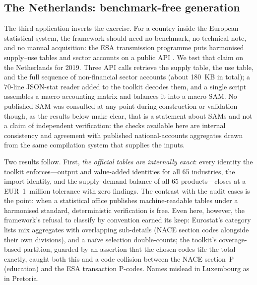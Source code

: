 \subsection{The Netherlands: benchmark-free generation}
\label{sec:applications:nl}

The third application inverts the exercise. For a country inside the
European statistical system, the framework should need no benchmark, no
technical note, and no manual acquisition: the ESA transmission programme
puts harmonised supply--use tables and sector accounts on a public API
\citep{eurostat2008}. We test that claim on the Netherlands for 2019.
Three API calls retrieve the supply table, the use table, and the full
sequence of non-financial sector accounts (about 180~KB in total); a
70-line JSON-stat reader added to the toolkit decodes them, and a single
script assembles a macro accounting matrix and balances it into a macro
SAM. No published SAM was consulted at any point during construction or
validation---though, as the results below make clear, that is a statement
about SAMs and not a claim of independent verification: the checks
available here are internal consistency and agreement with published
national-accounts aggregates drawn from the same compilation system that
supplies the inputs.

Two results follow. First, \emph{the official tables are internally
exact}: every identity the toolkit enforces---output and value-added
identities for all 65 industries, the import identity, and the
supply--demand balance of all 65 products---closes at a EUR~1~million
tolerance with zero findings. The contrast with the audit cases is the
point: when a statistical office publishes machine-readable tables under a
harmonised standard, deterministic verification is free. Even here,
however, the framework's refusal to classify by convention earned its
keep: Eurostat's category lists mix aggregates with overlapping
sub-details (NACE section codes alongside their own divisions), and a
na\"ive selection double-counts; the toolkit's coverage-based partition,
guarded by an assertion that the chosen codes tile the total exactly,
caught both this and a code collision between the NACE section~P
(education) and the ESA transaction P-codes. Names mislead in Luxembourg
as in Pretoria.

